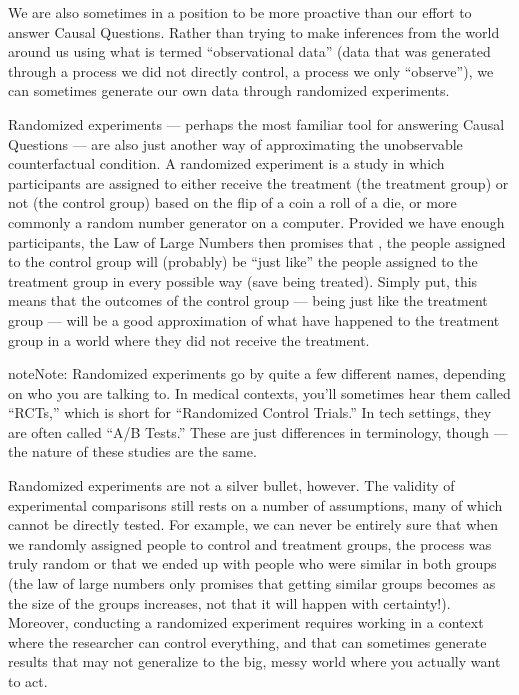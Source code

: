 \documentclass[letterpaper,10pt,english]{jupyterBook}
\begin{document}
\sphinxAtStartPar
We are also sometimes in a position to be more proactive than our effort to answer Causal Questions. Rather than trying to make inferences from the world around us using what is termed “observational data” (data that was generated through a process we did not directly control, a process we only “observe”), we can sometimes generate our own data through randomized experiments.

\sphinxAtStartPar
Randomized experiments — perhaps the most familiar tool for answering Causal Questions — are also just another way of approximating the unobservable counterfactual condition. A randomized experiment is a study in which participants are assigned to either receive the treatment (the treatment group) or not (the control group) based on the flip of a coin a roll of a die, or \sphinxhyphen{} more commonly \sphinxhyphen{} a random number generator on a computer. Provided we have enough participants, the Law of Large Numbers then promises that , the people assigned to the control group will (probably) be “just like” the people assigned to the treatment group in every possible way (save being treated). Simply put, this means that the outcomes of the control group — being just like the treatment group  — will be a good approximation of what  have happened to the treatment group in a world where they did not receive the treatment.

\begin{sphinxadmonition}{note}{Note:}
\sphinxAtStartPar
Randomized experiments go by quite a few different names, depending on who you are talking to. In medical contexts, you’ll sometimes hear them called “RCTs,” which is short for “Randomized Control Trials.” In tech settings, they are often called “A/B Tests.” These are just differences in terminology, though — the nature of these studies are the same.
\end{sphinxadmonition}

\sphinxAtStartPar
Randomized experiments are not a silver bullet, however. The validity of experimental comparisons still rests on a number of assumptions, many of which cannot be directly tested. For example, we can never be entirely sure that when we randomly assigned people to control and treatment groups, the process was truly random or that we ended up with people who were similar in both groups (the law of large numbers only promises that getting similar groups becomes  as the size of the groups increases, not that it will happen with certainty!). Moreover, conducting a randomized experiment requires working in a context where the researcher can control everything, and that can sometimes generate results that may not generalize to the big, messy world where you actually want to act.
\end{document}
